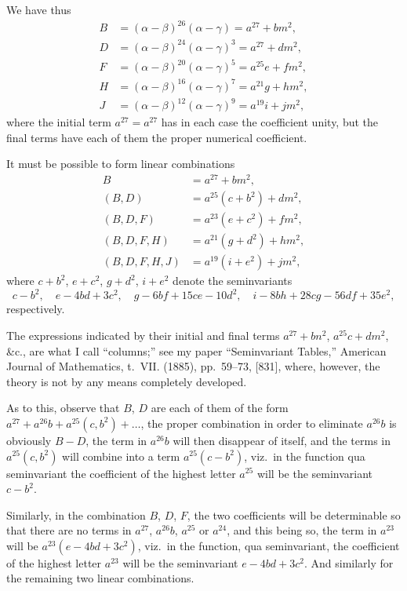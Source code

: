 \documentclass[11pt,a4paper]{article}
\theoremstyle{definition}
\begin{document}
We have thus
\begin{align*}
B &= (\alpha - \beta)^{26}(\alpha - \gamma) = a^{27} + bm^2,\\
D &= (\alpha - \beta)^{24}(\alpha - \gamma)^3 = a^{27} + dm^2,\\
F &= (\alpha - \beta)^{20}(\alpha - \gamma)^5 = a^{25}e + fm^2,\\
H &= (\alpha - \beta)^{16}(\alpha - \gamma)^7 = a^{21}g + hm^2,\\
J &= (\alpha - \beta)^{12}(\alpha - \gamma)^9 = a^{19}i + jm^2,
\end{align*}
where the initial term $a^{27} = a^{27}$ has in each case the coefficient unity, but the final terms have each of them the proper numerical coefficient.

It must be possible to form linear combinations
\begin{align*}
B &= a^{27} + bm^2,\\
(B, D) &= a^{25}(c + b^2) + dm^2,\\
(B, D, F) &= a^{23}(e + c^2) + fm^2,\\
(B, D, F, H) &= a^{21}(g + d^2) + hm^2,\\
(B, D, F, H, J) &= a^{19}(i + e^2) + jm^2,
\end{align*}
where $c + b^2$, $e + c^2$, $g + d^2$, $i + e^2$ denote the seminvariants
\[
c - b^2, \quad e - 4bd + 3c^2, \quad g - 6bf + 15ce - 10d^2, \quad i - 8bh + 28cg - 56df + 35e^2,
\]
respectively.

The expressions indicated by their initial and final terms $a^{27} + bn^2$, $a^{25}c + dm^2$, \&c., are what I call ``columns;'' see my paper ``Seminvariant Tables,'' American Journal of Mathematics, t.~VII. (1885), pp.~59--73, [831], where, however, the theory is not by any means completely developed.

As to this, observe that $B$, $D$ are each of them of the form $a^{27} + a^{26}b + a^{25}(c, b^2) + \ldots$, the proper combination in order to eliminate $a^{26}b$ is obviously $B - D$, the term in $a^{26}b$ will then disappear of itself, and the terms in $a^{25}(c, b^2)$ will combine into a term $a^{25}(c - b^2)$, viz.\ in the function qua seminvariant the coefficient of the highest letter $a^{25}$ will be the seminvariant $c - b^2$.

Similarly, in the combination $B$, $D$, $F$, the two coefficients will be determinable so that there are no terms in $a^{27}$, $a^{26}b$, $a^{25}$ or $a^{24}$, and this being so, the term in $a^{23}$ will be $a^{23}(e - 4bd + 3c^2)$, viz.\ in the function, qua seminvariant, the coefficient of the highest letter $a^{23}$ will be the seminvariant $e - 4bd + 3c^2$. And similarly for the remaining two linear combinations.
\end{document}
